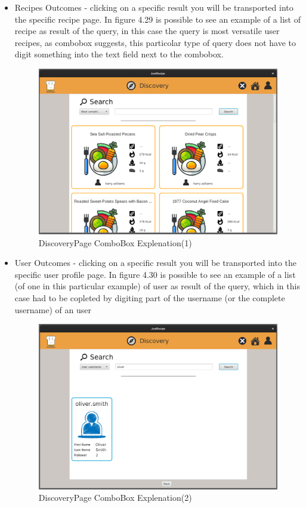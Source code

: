\documentclass[a4paper]{report}
\begin{document}
\begin{itemize}
	\item Recipes Outcomes - clicking on a specific result you will be transported into the specific recipe page.
	\subitem In figure 4.29 is possible to see an example of a list of recipe as result of the query, in this case the query is most versatile user recipes, as combobox suggests, this particolar type of query does not have to digit something into the text field next to the combobox.
	\begin{figure}[htpb]
		\centering
		\includegraphics[scale=0.37]{img/user_manual/combobox1.png}
		\caption{DiscoveryPage ComboBox Explenation(1)}
	\end{figure}
	\item User Outcomes - clicking on a specific result you will be transported into the specific user profile page.
	\subitem In figure 4.30 is possible to see an example of a list (of one in this particular example) of user as result of the query, which in this case had to be copleted by digiting part of the username (or the complete username) of an user
	\begin{figure}[htpb]
		\centering
		\includegraphics[scale=0.37]{img/user_manual/combobox2.png}
		\caption{DiscoveryPage ComboBox Explenation(2)}
	\end{figure}
\end{itemize}
\end{document}
